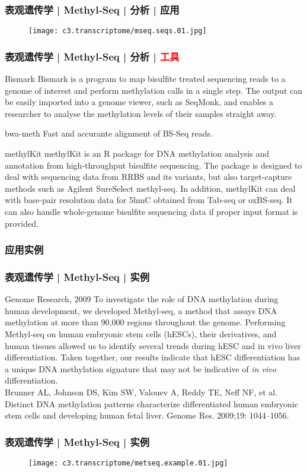 \begin{frame}
  \frametitle{表观遗传学 | Methyl-Seq | 分析 | 应用}
  \begin{figure}
    \centering
    \texttt{[image: c3.transcriptome/mseq.seqs.01.jpg]}
  \end{figure}
\end{frame}

\begin{frame}
  \frametitle{表观遗传学 | Methyl-Seq | 分析 | \textcolor{red}{工具}}
  {\footnotesize
  \begin{block}{Bismark}
    Bismark is a program to map bisulfite treated sequencing reads to a genome of interest and perform methylation calls in a single step. The output can be easily imported into a genome viewer, such as SeqMonk, and enables a researcher to analyse the methylation levels of their samples straight away.
  \end{block}
  \pause
  \begin{block}{bwa-meth}
  Fast and accurante alignment of BS-Seq reads.
  \end{block}
  \pause
  \begin{block}{methylKit}
    methylKit is an R package for DNA methylation analysis and annotation from high-throughput bisulfite sequencing. The package is designed to deal with sequencing data from RRBS and its variants, but also target-capture methods such as Agilent SureSelect methyl-seq. In addition, methylKit can deal with base-pair resolution data for 5hmC obtained from Tab-seq or oxBS-seq. It can also handle whole-genome bisulfite sequencing data if proper input format is provided.
  \end{block}
  }
\end{frame}

\subsubsection{应用实例}
\begin{frame}
  \frametitle{表观遗传学 | Methyl-Seq | 实例}
  \begin{block}{Genome Research, 2009}
    To investigate the role of DNA methylation during human development, we developed Methyl-seq, a method that assays DNA methylation at more than 90,000 regions throughout the genome. Performing Methyl-seq on human embryonic stem cells (hESCs), their derivatives, and human tissues allowed us to identify several trends during hESC and in vivo liver differentiation. Taken together, our results indicate that hESC differentiation has a unique DNA methylation signature that may not be indicative of \textit{in vivo} differentiation.\\
    \vspace{0.5em}
    Brunner AL, Johnson DS, Kim SW, Valouev A, Reddy TE, Neff NF, et al. Distinct DNA methylation patterns characterize differentiated human embryonic stem cells and developing human fetal liver. Genome Res. 2009;19: 1044–1056.
  \end{block}
\end{frame}

\begin{frame}
  \frametitle{表观遗传学 | Methyl-Seq | 实例}
  \begin{figure}
    \centering
    \texttt{[image: c3.transcriptome/metseq.example.01.jpg]}
  \end{figure}
\end{frame}

